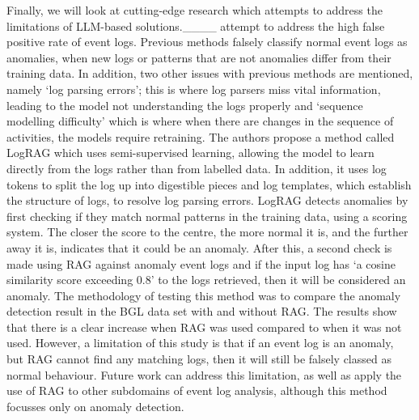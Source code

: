Finally, we will look at cutting-edge research which attempts to address the limitations of LLM-based solutions.____ attempt to address the high false positive rate of event logs. Previous methods falsely classify normal event logs as anomalies, when new logs or patterns that are not anomalies differ from their training data. In addition, two other issues with previous methods are mentioned, namely `log parsing errors'; this is where log parsers miss vital information, leading to the model not understanding the logs properly and `sequence modelling difficulty' which is where when there are changes in the sequence of activities, the models require retraining. The authors propose a method called LogRAG which uses semi-supervised learning, allowing the model to learn directly from the logs rather than from labelled data. In addition, it uses log tokens to split the log up into digestible pieces and log templates, which establish the structure of logs, to resolve log parsing errors. LogRAG detects anomalies by first checking if they match normal patterns in the training data, using a scoring system. The closer the score to the centre, the more normal it is, and the further away it is, indicates that it could be an anomaly. After this, a second check is made using RAG against anomaly event logs and if the input log has `a cosine similarity score exceeding 0.8' to the logs retrieved, then it will be considered an anomaly. The methodology of testing this method was to compare the anomaly detection result in the BGL data set with and without RAG. The results show that there is a clear increase when RAG was used compared to when it was not used. However, a limitation of this study is that if an event log is an anomaly, but RAG cannot find any matching logs, then it will still be falsely classed as normal behaviour.  Future work can address this limitation, as well as apply the use of RAG to other subdomains of event log analysis, although this method focusses only on anomaly detection. 

